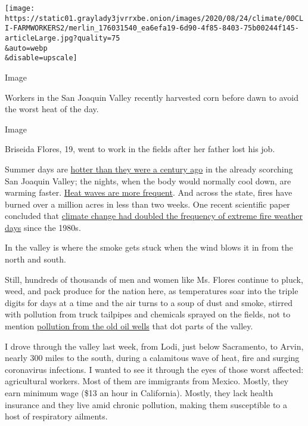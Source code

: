 \texttt{[image: https://static01.graylady3jvrrxbe.onion/images/2020/08/24/climate/00CLI-FARMWORKERS2/merlin\_176031540\_ea6efa19-6d90-4f85-8403-75b00244f145-articleLarge.jpg?quality=75\\\&auto=webp\\\&disable=upscale]}

Image

Workers in the San Joaquin Valley recently harvested corn before dawn to
avoid the worst heat of the day.

Image

Briseida Flores, 19, went to work in the fields after her father lost
his job.

Summer days are
\href{https://www.ncdc.noaa.gov/cag/statewide/time-series/4/tavg/ann/7/1895-2020?base_prd=true\&begbaseyear=1901\&endbaseyear=2000}{hotter
than they were a century ago} in the already scorching San Joaquin
Valley; the nights, when the body would normally cool down, are warming
faster.
\href{https://oehha.ca.gov/media/downloads/climate-change/report/2018caindicatorsreportmay2018.pdf}{Heat
waves are more frequent}. And across the state, fires have burned over a
million acres in less than two weeks. One recent scientific paper
concluded that
\href{https://iopscience.iop.org/article/10.1088/1748-9326/ab83a7}{climate
change had doubled the frequency of extreme fire weather days} since the
1980s.

In the valley is where the smoke gets stuck when the wind blows it in
from the north and south.

Still, hundreds of thousands of men and women like Ms. Flores continue
to pluck, weed, and pack produce for the nation here, as temperatures
soar into the triple digits for days at a time and the air turns to a
soup of dust and smoke, stirred with pollution from truck tailpipes and
chemicals sprayed on the fields, not to mention
\href{https://theconversation.com/living-near-active-oil-and-gas-wells-in-california-tied-to-low-birth-weight-and-smaller-babies-140034}{pollution
from the old oil wells} that dot parts of the valley.

I drove through the valley last week, from Lodi, just below Sacramento,
to Arvin, nearly 300 miles to the south, during a calamitous wave of
heat, fire and surging coronavirus infections. I wanted to see it
through the eyes of those worst affected: agricultural workers. Most of
them are immigrants from Mexico. Mostly, they earn minimum wage (\$13 an
hour in California). Mostly, they lack health insurance and they live
amid chronic pollution, making them susceptible to a host of respiratory
ailments.

